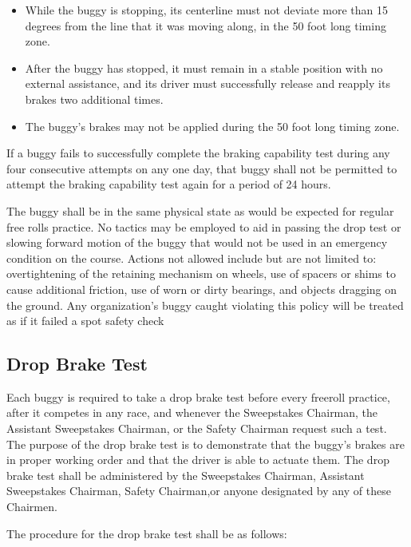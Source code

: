 \begin{itemize}
		\item
		While the buggy is stopping, its centerline must not deviate more than 15
		degrees from the line that it was moving along, in the 50 foot long timing
		zone.

		\item
		After the buggy has stopped, it must remain in a stable position with no
		external assistance, and its driver must successfully release and reapply its
		brakes two additional times.

		\item
		The buggy's brakes may not be applied during the 50 foot long timing zone.

	\end{itemize}

	If a buggy fails to successfully complete the braking capability test during
	any four consecutive attempts on any one day, that buggy shall not be permitted
	to attempt the braking capability test again for a period of 24 hours.

	The buggy shall be in the same physical state as would be expected for regular
	free rolls practice. No tactics may be employed to aid in passing the drop test
	or slowing forward motion of the buggy that would not be used in an emergency
	condition on the course. Actions not allowed include but are not limited to:
	overtightening of the retaining mechanism on wheels, use of spacers or shims to
	cause additional friction, use of worn or dirty bearings, and objects dragging
	on the ground. Any organization's buggy caught violating this policy will be
	treated as if it failed a spot safety check

\subsection{Drop Brake Test}

	Each buggy is required to take a drop brake test before every freeroll
	practice, after it competes in any race, and whenever the Sweepstakes Chairman,
	the Assistant Sweepstakes Chairman, or the Safety Chairman request such a test.
	The purpose of the drop brake test is to demonstrate that the buggy's brakes
	are in proper working order and that the driver is able to actuate them. The
	drop brake test shall be administered by the Sweepstakes Chairman, Assistant
	Sweepstakes Chairman, Safety Chairman,or anyone designated by any of these
	Chairmen.
	\newline

	\noindent The procedure for the drop brake test shall be as follows:

